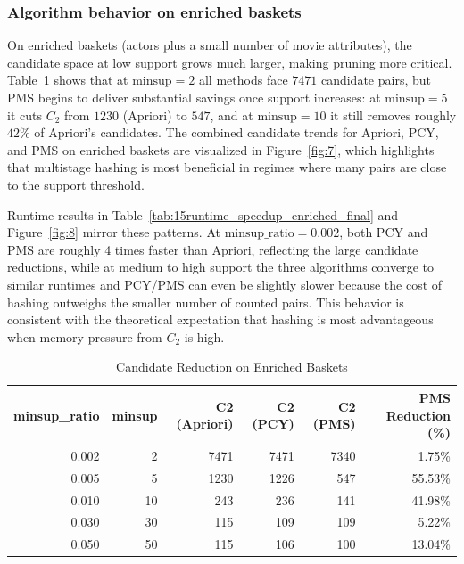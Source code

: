 \documentclass{article}  %
\begin{document}
\subsubsection{Algorithm behavior on enriched baskets}

On enriched baskets (actors plus a small number of movie attributes), the candidate space at low support grows much larger, making pruning more critical. Table~\ref{tab:14candidate_reduction_enriched} shows that at \(\mathrm{minsup} = 2\) all methods face \(7471\) candidate pairs, but PMS begins to deliver substantial savings once support increases: at \(\mathrm{minsup} = 5\) it cuts \(C_{2}\) from \(1230\) (Apriori) to \(547\),
and at \(\mathrm{minsup} = 10\) it still removes roughly \(42\%\) of Apriori's candidates. The combined candidate trends for Apriori, PCY, and PMS on enriched baskets are visualized in Figure~\ref{fig:7}, which highlights that multistage hashing is most beneficial in regimes where many pairs are close to the support threshold.

Runtime results in Table~\ref{tab:15runtime_speedup_enriched_final} and
Figure~\ref{fig:8} mirror these patterns. At \(\mathrm{minsup\_ratio} = 0.002\), both PCY and PMS are roughly 4 times faster than Apriori, reflecting the large candidate reductions, while at medium to high support the three algorithms converge to similar runtimes and PCY/PMS can even be slightly slower because the cost of hashing outweighs the smaller number of counted pairs. This behavior is consistent with the theoretical expectation that hashing is most advantageous when memory pressure from \(C_{2}\) is high.

\begin{table}[!htbp]
    \caption{Candidate Reduction on Enriched Baskets}
    \centering
    \normalsize
    \setlength{\tabcolsep}{4pt}
    \renewcommand{\arraystretch}{1.1}
    \begin{tabular}{rrrrrr}
        \toprule
        \textbf{minsup\_ratio} & \textbf{minsup} &
        \textbf{C2 (Apriori)} & \textbf{C2 (PCY)} &
        \textbf{C2 (PMS)} & \textbf{PMS Reduction (\%)} \\
        \midrule
        0.002 & 2  & 7471 & 7471 & 7340 & 1.75\%  \\
        0.005 & 5  & 1230 & 1226 & 547  & 55.53\% \\
        0.010 & 10 & 243  & 236  & 141  & 41.98\% \\
        0.030 & 30 & 115  & 109  & 109  & 5.22\%  \\
        0.050 & 50 & 115  & 106  & 100  & 13.04\% \\
        \bottomrule
    \end{tabular}%
    \label{tab:14candidate_reduction_enriched}
\end{table}
\end{document}
